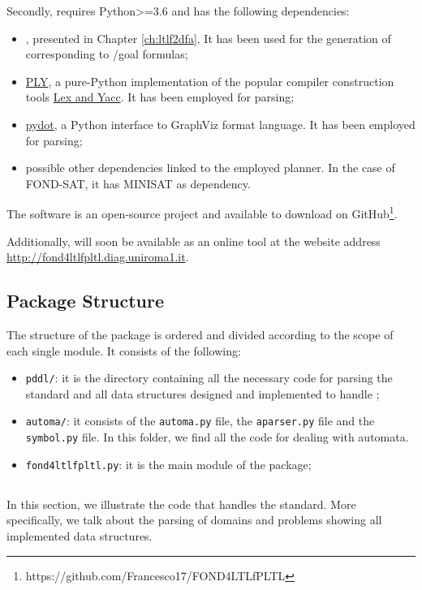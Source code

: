 Secondly, \FONDFOR requires Python>=3.6 and has the following dependencies:
\begin{itemize}
\item \LTLfToDFA, presented in Chapter \ref{ch:ltlf2dfa}. It has been used for the generation of \DFAs corresponding to \LTLf/\PLTL goal formulas;
\item \href{http://www.dabeaz.com/ply/ply.html}{PLY}, a pure-Python implementation of the popular compiler construction tools \href{http://dinosaur.compilertools.net/}{Lex and Yacc}. It has been employed for \PDDL parsing;
\item \href{https://pypi.org/project/pydot/}{pydot}, a Python interface to GraphViz format language. It has been employed for \DFAs parsing;
\item possible other dependencies linked to the employed planner. In the case of FOND-SAT, it has MINISAT as dependency.
\end{itemize} 
The \FONDFOR software is an open-source project and available to download on GitHub\footnote{https://github.com/Francesco17/FOND4LTLfPLTL}.

Additionally, \FONDFOR will soon be available as an online tool at the website address \href{http://fond4ltlfpltl.diag.uniroma1.it}{http://fond4ltlfpltl.diag.uniroma1.it}.
\subsection{Package Structure}
The structure of the \FONDFOR package is ordered and divided according to the scope of each single module. It consists of the following:
\begin{itemize}
\item \texttt{pddl/}: it is the directory containing all the necessary code for parsing the \PDDL standard and all data structures designed and implemented to handle \PDDL;
\item  \texttt{automa/}: it consists of the \texttt{automa.py} file, the \texttt{aparser.py} file and the \texttt{symbol.py} file. In this folder, we find all the code for dealing with automata.
\item \texttt{fond4ltlfpltl.py}: it is the main module of the package;
\end{itemize}
\subsection{\PDDL}\label{sec:impl-pddl}
In this section, we illustrate the code that handles the \PDDL standard. More specifically, we talk about the parsing of \PDDL domains and problems showing all implemented data structures.

